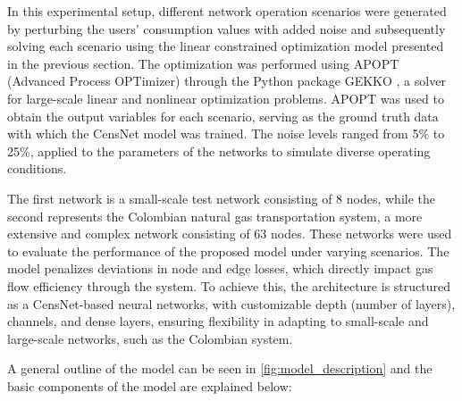 In this experimental setup, different network operation scenarios were generated by perturbing the users' consumption values with added noise and subsequently solving each scenario using the linear constrained optimization model presented in the previous section. The optimization was performed using APOPT (Advanced Process OPTimizer) through the Python package GEKKO \cite{Beal_Hill_Martin_Hedengren_2018}, a solver for large-scale linear and nonlinear optimization problems. APOPT was used to obtain the output variables for each scenario, serving as the ground truth data with which the CensNet model was trained. The noise levels ranged from 5\% to 25\%, applied to the parameters of the networks to simulate diverse operating conditions. 


The first network is a small-scale test network consisting of 8 nodes, while the second represents the Colombian natural gas transportation system, a more extensive and complex network consisting of 63 nodes. These networks were used to evaluate the performance of the proposed model under varying scenarios. The model penalizes deviations in node and edge losses, which directly impact gas flow efficiency through the system. To achieve this, the architecture is structured as a CensNet-based neural networks, with customizable depth (number of layers), channels, and dense layers, ensuring flexibility in adapting to small-scale and large-scale networks, such as the Colombian system.

A general outline of the model can be seen in \cref{fig:model_description} and the basic components of the model are explained below:

